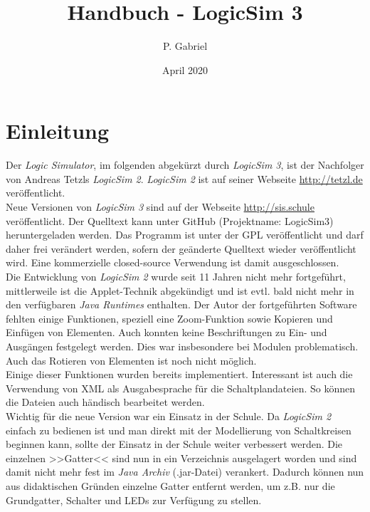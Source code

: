 \documentclass[12pt]{scrartcl}
\begin{document}
\newcommand{\lsN}{\textit{LogicSim 3}}
\newcommand{\lsA}{\textit{LogicSim 2}}


\title{Handbuch - LogicSim 3}
\author{P. Gabriel}
\date{April 2020}

\vspace*{-11mm}

\section{Einleitung}
Der \textit{Logic Simulator}, im folgenden abgekürzt durch \lsN{}, ist der Nachfolger von Andreas Tetzls \lsA{}. \lsA{} ist auf seiner Webseite \url{http://tetzl.de} veröffentlicht.\\

Neue Versionen von \lsN{} sind auf der Webseite \url{http://sis.schule} veröffentlicht. Der Quelltext kann unter GitHub (Projektname: LogicSim3) heruntergeladen werden. Das Programm ist unter der GPL veröffentlicht und darf daher frei verändert werden, sofern der geänderte Quelltext wieder veröffentlicht wird. Eine kommerzielle closed-source Verwendung ist damit ausgeschlossen.\\

Die Entwicklung von \lsA{} wurde seit 11 Jahren nicht mehr fortgeführt, mittlerweile ist die Applet-Technik abgekündigt und ist evtl. bald nicht mehr in den verfügbaren \textit{Java Runtimes} enthalten. Der Autor der fortgeführten Software fehlten einige Funktionen, speziell eine Zoom-Funktion sowie Kopieren und Einfügen von Elementen. Auch konnten keine Beschriftungen zu Ein- und Ausgängen festgelegt werden. Dies war insbesondere bei Modulen problematisch. Auch das Rotieren von Elementen ist noch nicht möglich.\\

Einige dieser Funktionen wurden bereits implementiert. Interessant ist auch die Verwendung von XML als Ausgabesprache für die Schaltplandateien. So können die Dateien auch händisch bearbeitet werden.\\

Wichtig für die neue Version war ein Einsatz in der Schule. Da \lsA{} einfach zu bedienen ist und man direkt mit der Modellierung von Schaltkreisen beginnen kann, sollte der Einsatz in der Schule weiter verbessert werden. Die einzelnen >>Gatter<< sind nun in ein Verzeichnis ausgelagert worden und sind damit nicht mehr fest im \textit{Java Archiv} (.jar-Datei) verankert. Dadurch können nun aus didaktischen Gründen einzelne Gatter entfernt werden, um z.B. nur die Grundgatter, Schalter und LEDs zur Verfügung zu stellen.\\
\end{document}
